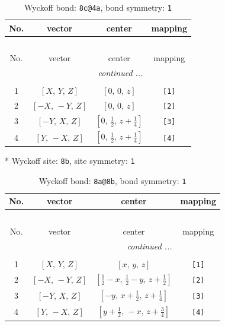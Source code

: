\documentclass[fleqn,8pt]{jsarticle}
\begin{document}
\renewcommand{\arraystretch}{1.2}
\begin{longtable}{cccc}
\caption{Wyckoff bond: {\tt 8c@4a}, bond symmetry: {\tt 1}}
 \\
 \hline \hline
No. & vector & center & mapping \\ \hline \endfirsthead

\multicolumn{3}{l}{\tablename\ \thetable{}} \\
 \hline \hline
No. & vector & center & mapping \\ \hline \endhead

 \hline \hline
\multicolumn{3}{r}{\footnotesize\it continued ...} \\ \endfoot

 \hline \hline
\multicolumn{3}{r}{} \\ \endlastfoot

1 & $\left[ X,\, Y,\, Z \right]$ & $\left[ 0,\, 0,\, z \right]$ & {\tt [1]} \\ \hline
2 & $\left[ - X,\, - Y,\, Z \right]$ & $\left[ 0,\, 0,\, z \right]$ & {\tt [2]} \\ \hline
3 & $\left[ - Y,\, X,\, Z \right]$ & $\left[ 0,\, \frac{1}{2},\, z + \frac{1}{4} \right]$ & {\tt [3]} \\ \hline
4 & $\left[ Y,\, - X,\, Z \right]$ & $\left[ 0,\, \frac{1}{2},\, z + \frac{1}{4} \right]$ & {\tt [4]} \\
\end{longtable}
* Wyckoff site: {\tt 8b}, site symmetry: {\tt 1}
\renewcommand{\arraystretch}{1.2}
\begin{longtable}{cccc}
\caption{Wyckoff bond: {\tt 8a@8b}, bond symmetry: {\tt 1}}
 \\
 \hline \hline
No. & vector & center & mapping \\ \hline \endfirsthead

\multicolumn{3}{l}{\tablename\ \thetable{}} \\
 \hline \hline
No. & vector & center & mapping \\ \hline \endhead

 \hline \hline
\multicolumn{3}{r}{\footnotesize\it continued ...} \\ \endfoot

 \hline \hline
\multicolumn{3}{r}{} \\ \endlastfoot

1 & $\left[ X,\, Y,\, Z \right]$ & $\left[ x,\, y,\, z \right]$ & {\tt [1]} \\ \hline
2 & $\left[ - X,\, - Y,\, Z \right]$ & $\left[ \frac{1}{2} - x,\, \frac{1}{2} - y,\, z + \frac{1}{2} \right]$ & {\tt [2]} \\ \hline
3 & $\left[ - Y,\, X,\, Z \right]$ & $\left[ - y,\, x + \frac{1}{2},\, z + \frac{1}{4} \right]$ & {\tt [3]} \\ \hline
4 & $\left[ Y,\, - X,\, Z \right]$ & $\left[ y + \frac{1}{2},\, - x,\, z + \frac{3}{4} \right]$ & {\tt [4]} \\
\end{longtable}
\end{document}
